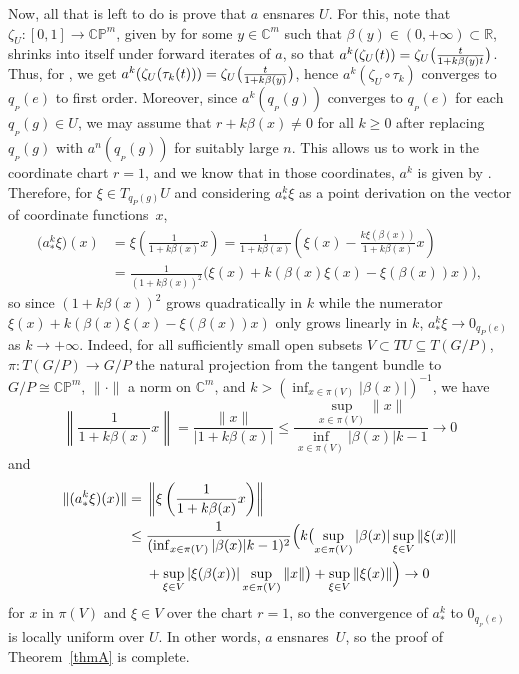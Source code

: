 \documentclass[pdftex]{sigma}
\numberwithin{equation}{section}
\theoremstyle{definition}
\begin{document}
Now, all that is left to do is prove that $a$ ensnares $U$. For this, note that $\zeta_U\colon [0,1]\to\mathbb{CP}^m$, given by  for some $y\in\mathbb{C}^m$ such that $\beta(y)\in(0,+\infty)\subset\mathbb{R}$, shrinks into itself under forward iterates of $a$, so that $a^k(\zeta_U(t))=\smash{\zeta_U\bigl(\tfrac{t}{1+k\beta(y)t}\bigr)}$. Thus, for , we get $a^k(\zeta_U(\tau_k(t)))=\smash{\zeta_U\bigl(\tfrac{t}{1+k\beta(y)}\bigr)}$, hence $a^k(\zeta_U\circ\tau_k)$ converges to $q_{{}_P}(e)$ to first order.
Moreover, since $a^k(q_{{}_P}(g))$ converges to $q_{{}_P}(e)$ for each $q_{{}_P}(g)\in U$, we may assume that $r+k\beta(x)\neq 0$ for all $k\geq 0$ after replacing $q_{{}_P}(g)$ with $a^n(q_{{}_P}(g))$ for suitably large $n$. This allows us to work in the coordinate chart $r=1$, and we know that in those coordinates, $a^k$ is given by . Therefore, for $\xi\in T_{q_P(g)}U$ and considering $a^k_*\xi$ as a point derivation on the vector of coordinate functions~$x$,
\begin{align*}
\bigl(a^k_*\xi\bigr)(x) & =\xi\left(\frac{1}{1+k\beta(x)}x\right)=\frac{1}{1+k\beta(x)}\left(\xi(x)-\frac{k\xi(\beta(x))}{1+k\beta(x)}x\right) \\ & =\frac{1}{(1+k\beta(x))^2}\big(\xi(x)+k(\beta(x)\xi(x)-\xi(\beta(x))x)\big),
\end{align*}
so since $(1+k\beta(x))^2$ grows quadratically in $k$ while the numerator $\xi(x)+k(\beta(x)\xi(x)-\xi(\beta(x))x)$ only grows linearly in $k$, $a^k_*\xi\rightarrow 0_{q_P(e)}$ as $k\rightarrow+\infty$. Indeed, for all sufficiently small open subsets $V\subset TU\subseteq T(G/P)$, $\pi\colon T(G/P)\to G/P$ the natural projection from the tangent bundle to $G/P\cong\mathbb{CP}^m$, $\|\cdot\|$ a norm on $\mathbb{C}^m$, and $k>(\inf_{x\in\pi(V)}|\beta(x)|)^{-1}$, we have
\[
\left\|\frac{1}{1+k\beta(x)}x\right\|=\frac{\|x\|}{|1+k\beta(x)|} \leq\frac{\sup_{x\in\pi(V)}\|x\|}{\inf_{x\in\pi(V)}|\beta(x)|k-1}\rightarrow 0\]
and
\begin{align*}
\|(a^k_*\xi)(x)\| ={}&\left\|\xi\left(\frac{1}{1+k\beta(x)}x\right)\right\| \\ \leq{} &\frac{1}{(\inf_{x\in\pi(V)}|\beta(x)|k-1)^2}\Bigl(k\bigl(\sup_{x\in\pi(V)}|\beta(x)|\sup_{\xi\in V}\|\xi(x)\| \\ & +\sup_{\xi\in V}|\xi(\beta(x))|\sup_{x\in\pi(V)}\|x\|\bigr)+\sup_{\xi\in V}\|\xi(x)\|\Bigr)\rightarrow 0
\end{align*}
for $x$ in $\pi(V)$ and $\xi\in V$ over the chart $r=1$, so the convergence of $a^k_*$ to $0_{q_{{}_P}(e)}$ is locally uniform over $U$. In other words, $a$ ensnares~$U$, so the proof of Theorem~\ref{thmA} is complete.
\end{document}
